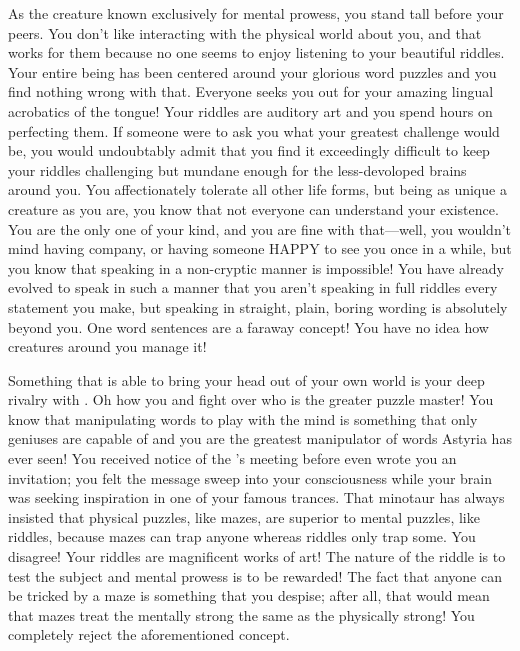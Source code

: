 \documentclass[char]{guildcamp2}
\begin{document}
\name{\cSphinx{}}


As the creature known exclusively for mental prowess, you stand tall before your peers. You don't like interacting with the physical world about you, and that works for them because no one seems to enjoy listening to your beautiful riddles. Your entire being has been centered around your glorious word puzzles and you find nothing wrong with that. Everyone seeks you out for your amazing lingual acrobatics of the tongue! Your riddles are auditory art and you spend hours on perfecting them. If someone were to ask you what your greatest challenge would be, you would undoubtably admit that you find it exceedingly difficult to keep your riddles challenging but mundane enough for the less-devoloped brains around you. You affectionately tolerate all other life forms, but being as unique a creature as you are, you know that not everyone can understand your existence. You are the only one of your kind, and you are fine with that---well, you wouldn't mind having company, or having someone HAPPY  to see you once in a while, but you know that speaking in a non-cryptic manner is impossible! You have already evolved to speak in such a manner that you aren't speaking in full riddles every statement you make, but speaking in straight, plain, boring wording is absolutely beyond you. One word sentences are a faraway concept! You have no idea how creatures around you manage it!

Something that is able to bring your head out of your own world is your deep rivalry with \cMinotaur{}. Oh how you and \cMinotaur{\they} fight over who is the greater puzzle master! You know that manipulating words to play with the mind is something that only geniuses are capable of and you are the greatest manipulator of words Astyria has ever seen! You received notice of the \cOnyx{}'s meeting before \cOnyx{} even wrote you an invitation; you felt the message sweep into your consciousness while your brain was seeking inspiration in one of your famous trances. That minotaur has always insisted that physical puzzles, like mazes, are superior to mental puzzles, like riddles, because mazes can trap anyone whereas riddles only trap some. You disagree! Your riddles are magnificent works of art! The nature of the riddle is to test the subject and mental prowess is to be rewarded! The fact that anyone can be tricked by a maze is something that you despise; after all, that would mean that mazes treat the mentally strong the same as the physically strong! You completely reject the aforementioned concept. 
\end{document}
